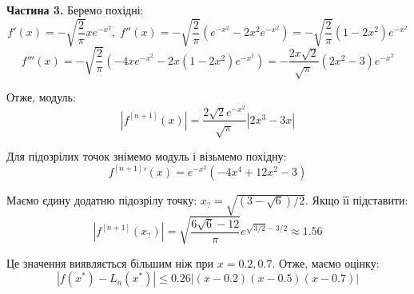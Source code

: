 \documentclass[12pt]{extarticle}
\begin{document}
\textbf{Частина 3.} Беремо похідні:
\[
f'(x) = -\sqrt{\frac{2}{\pi}}xe^{-x^2}, \; f''(x) = -\sqrt{\frac{2}{\pi}}(e^{-x^2} - 2x^2 e^{-x^2}) = -\sqrt{\frac{2}{\pi}}(1-2x^2)e^{-x^2}
\]
\[
f'''(x) = -\sqrt{\frac{2}{\pi}}(-4xe^{-x^2} - 2x(1-2x^2)e^{-x^2}) = -\frac{2x\sqrt{2}}{\sqrt{\pi}}(2x^2-3)e^{-x^2}
\]

Отже, модуль:
\[
|f^{[n+1]}(x)| = \frac{2\sqrt{2}e^{-x^2}}{\sqrt{\pi}}|2x^3-3x|
\]

Для підозрілих точок знімемо модуль і візьмемо похідну:
\[
f^{[n+1]}'(x) = e^{-x^2}(-4x^4+12x^2-3)
\]

Маємо єдину додатню підозрілу точку: $x_? = \sqrt{(3-\sqrt{6})/2}$. Якщо її підставити:
\[
|f^{[n+1]}(x_?)| = \sqrt{\frac{6\sqrt{6}-12}{\pi}} e^{\sqrt{3/2}-3/2} \approx 1.56
\]

Це значення виявляється більшим ніж при $x=0.2,0.7$. Отже, маємо оцінку:
\[
|f(x^*)-L_n(x^*)| \leq 0.26|(x-0.2)(x-0.5)(x-0.7)|
\]
\end{document}

